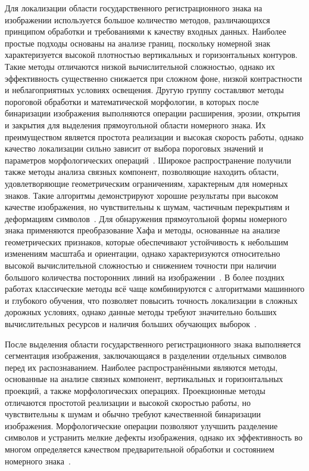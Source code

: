 \documentclass[12pt]{article}
\theoremstyle{definition}
\begin{document}
Для локализации области государственного регистрационного знака на изображении используется большое количество методов, различающихся принципом обработки и требованиями к качеству входных данных. Наиболее простые подходы основаны на анализе границ, поскольку номерной знак характеризуется высокой плотностью вертикальных и горизонтальных контуров. Такие методы отличаются низкой вычислительной сложностью, однако их эффективность существенно снижается при сложном фоне, низкой контрастности и неблагоприятных условиях освещения. Другую группу составляют методы пороговой обработки и математической морфологии, в которых после бинаризации изображения выполняются операции расширения, эрозии, открытия и закрытия для выделения прямоугольной области номерного знака. Их преимуществом является простота реализации и высокая скорость работы, однако качество локализации сильно зависит от выбора пороговых значений и параметров морфологических операций~\cite{cho2011license, ashourian2013real, teoh2015performance, Haider2017, jia2016design, Yepez2018}. Широкое распространение получили также методы анализа связных компонент, позволяющие находить области, удовлетворяющие геометрическим ограничениям, характерным для номерных знаков. Такие алгоритмы демонстрируют хорошие результаты при высоком качестве изображения, но чувствительны к шумам, частичным перекрытиям и деформациям символов~\cite{Kumawat2023}. Для обнаружения прямоугольной формы номерного знака применяются преобразование Хафа и методы, основанные на анализе геометрических признаков, которые обеспечивают устойчивость к небольшим изменениям масштаба и ориентации, однако характеризуются относительно высокой вычислительной сложностью и снижением точности при наличии большого количества посторонних линий на изображении~\cite{Sferle2019}. В более поздних работах классические методы всё чаще комбинируются с алгоритмами машинного и глубокого обучения, что позволяет повысить точность локализации в сложных дорожных условиях, однако данные методы требуют значительно больших вычислительных ресурсов и наличия больших обучающих выборок~\cite{Sonnara2025,ANPR21,Upadhye2025}.

После выделения области государственного регистрационного знака выполняется сегментация изображения, заключающаяся в разделении отдельных символов перед их распознаванием. Наиболее распространёнными являются методы, основанные на анализе связных компонент, вертикальных и горизонтальных проекций, а также морфологических операциях. Проекционные методы отличаются простотой реализации и высокой скоростью работы, но чувствительны к шумам и обычно требуют качественной бинаризации изображения. Морфологические операции позволяют улучшить разделение символов и устранить мелкие дефекты изображения, однако их эффективность во многом определяется качеством предварительной обработки и состоянием номерного знака~\cite{ANPR21}.
\end{document}
